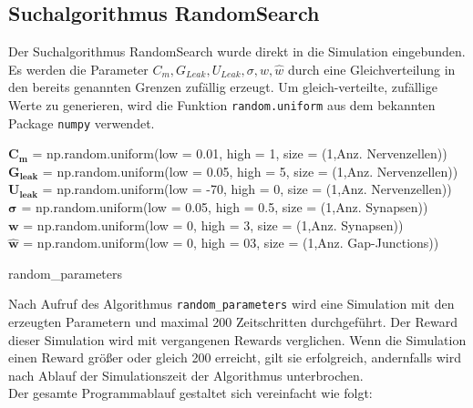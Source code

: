 	\subsection{Suchalgorithmus RandomSearch}
		Der Suchalgorithmus RandomSearch wurde direkt in die Simulation eingebunden. Es werden die Parameter $C_m, G_{Leak}, U_{Leak}, \sigma, w, \hat{w}$ durch eine Gleichverteilung in den bereits genannten Grenzen zufällig erzeugt. Um gleich-verteilte, zufällige Werte zu generieren, wird die Funktion \texttt{random.uniform} aus dem bekannten Package \texttt{numpy} \cite{NumPy} verwendet.
		\begin{algorithm}
			
				$\boldsymbol{C_m}$ = np.random.uniform(low = 0.01, high = 1, size = (1,Anz. Nervenzellen))\\
				$\boldsymbol{G_{leak}}$ = np.random.uniform(low = 0.05, high = 5, size = (1,Anz. Nervenzellen))\\
				$\boldsymbol{U_{leak}}$ = np.random.uniform(low = -70, high = 0, size = (1,Anz. Nervenzellen))\\
				$\boldsymbol{\sigma}$ = np.random.uniform(low = 0.05, high = 0.5, size = (1,Anz. Synapsen))\\
				$\boldsymbol{w}$ = np.random.uniform(low = 0, high = 3, size = (1,Anz. Synapsen))\\
				$\boldsymbol{\hat{w}}$ = np.random.uniform(low = 0, high = 03, size = (1,Anz. Gap-Junctions))
			\caption{random\_parameters}
		\end{algorithm}
		Nach Aufruf des Algorithmus \texttt{random\_parameters} wird eine Simulation mit den erzeugten Parametern und maximal 200 Zeitschritten durchgeführt. Der Reward dieser Simulation wird mit vergangenen Rewards verglichen. Wenn die Simulation einen Reward größer oder gleich 200 erreicht, gilt sie erfolgreich, andernfalls wird nach Ablauf der Simulationszeit der Algorithmus unterbrochen.\\
		Der gesamte Programmablauf gestaltet sich vereinfacht wie folgt:
